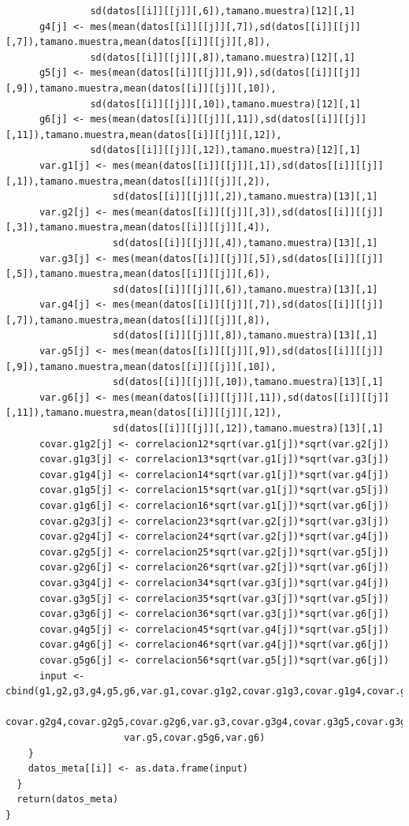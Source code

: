 \documentclass[a4paper,openright,12pt]{report}
\begin{document}
{\begin{verbatim}
               sd(datos[[i]][[j]][,6]),tamano.muestra)[12][,1]
      g4[j] <- mes(mean(datos[[i]][[j]][,7]),sd(datos[[i]][[j]][,7]),tamano.muestra,mean(datos[[i]][[j]][,8]),
               sd(datos[[i]][[j]][,8]),tamano.muestra)[12][,1]
      g5[j] <- mes(mean(datos[[i]][[j]][,9]),sd(datos[[i]][[j]][,9]),tamano.muestra,mean(datos[[i]][[j]][,10]),
               sd(datos[[i]][[j]][,10]),tamano.muestra)[12][,1]
      g6[j] <- mes(mean(datos[[i]][[j]][,11]),sd(datos[[i]][[j]][,11]),tamano.muestra,mean(datos[[i]][[j]][,12]),
               sd(datos[[i]][[j]][,12]),tamano.muestra)[12][,1]
      var.g1[j] <- mes(mean(datos[[i]][[j]][,1]),sd(datos[[i]][[j]][,1]),tamano.muestra,mean(datos[[i]][[j]][,2]),
                   sd(datos[[i]][[j]][,2]),tamano.muestra)[13][,1]
      var.g2[j] <- mes(mean(datos[[i]][[j]][,3]),sd(datos[[i]][[j]][,3]),tamano.muestra,mean(datos[[i]][[j]][,4]),
                   sd(datos[[i]][[j]][,4]),tamano.muestra)[13][,1]
      var.g3[j] <- mes(mean(datos[[i]][[j]][,5]),sd(datos[[i]][[j]][,5]),tamano.muestra,mean(datos[[i]][[j]][,6]),
                   sd(datos[[i]][[j]][,6]),tamano.muestra)[13][,1]
      var.g4[j] <- mes(mean(datos[[i]][[j]][,7]),sd(datos[[i]][[j]][,7]),tamano.muestra,mean(datos[[i]][[j]][,8]),
                   sd(datos[[i]][[j]][,8]),tamano.muestra)[13][,1]
      var.g5[j] <- mes(mean(datos[[i]][[j]][,9]),sd(datos[[i]][[j]][,9]),tamano.muestra,mean(datos[[i]][[j]][,10]),
                   sd(datos[[i]][[j]][,10]),tamano.muestra)[13][,1]
      var.g6[j] <- mes(mean(datos[[i]][[j]][,11]),sd(datos[[i]][[j]][,11]),tamano.muestra,mean(datos[[i]][[j]][,12]),
                   sd(datos[[i]][[j]][,12]),tamano.muestra)[13][,1]
      covar.g1g2[j] <- correlacion12*sqrt(var.g1[j])*sqrt(var.g2[j])
      covar.g1g3[j] <- correlacion13*sqrt(var.g1[j])*sqrt(var.g3[j])
      covar.g1g4[j] <- correlacion14*sqrt(var.g1[j])*sqrt(var.g4[j])
      covar.g1g5[j] <- correlacion15*sqrt(var.g1[j])*sqrt(var.g5[j])
      covar.g1g6[j] <- correlacion16*sqrt(var.g1[j])*sqrt(var.g6[j])
      covar.g2g3[j] <- correlacion23*sqrt(var.g2[j])*sqrt(var.g3[j])
      covar.g2g4[j] <- correlacion24*sqrt(var.g2[j])*sqrt(var.g4[j])
      covar.g2g5[j] <- correlacion25*sqrt(var.g2[j])*sqrt(var.g5[j])
      covar.g2g6[j] <- correlacion26*sqrt(var.g2[j])*sqrt(var.g6[j])
      covar.g3g4[j] <- correlacion34*sqrt(var.g3[j])*sqrt(var.g4[j])
      covar.g3g5[j] <- correlacion35*sqrt(var.g3[j])*sqrt(var.g5[j])
      covar.g3g6[j] <- correlacion36*sqrt(var.g3[j])*sqrt(var.g6[j])
      covar.g4g5[j] <- correlacion45*sqrt(var.g4[j])*sqrt(var.g5[j])
      covar.g4g6[j] <- correlacion46*sqrt(var.g4[j])*sqrt(var.g6[j])
      covar.g5g6[j] <- correlacion56*sqrt(var.g5[j])*sqrt(var.g6[j])
      input <- cbind(g1,g2,g3,g4,g5,g6,var.g1,covar.g1g2,covar.g1g3,covar.g1g4,covar.g1g5,covar.g1g6,var.g2,covar.g2g3,
                     covar.g2g4,covar.g2g5,covar.g2g6,var.g3,covar.g3g4,covar.g3g5,covar.g3g6,var.g4,covar.g4g5,covar.g4g6,
                     var.g5,covar.g5g6,var.g6)
    }
    datos_meta[[i]] <- as.data.frame(input)
  }
  return(datos_meta)
}
\end{verbatim}}
\end{document}
